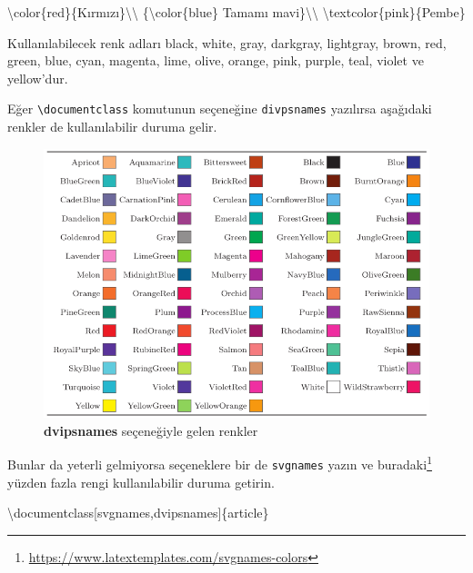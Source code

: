 \documentclass[
  10pt,
]{scrbook}
\newenvironment{Shaded}{\begin{snugshade}}{\end{snugshade}}
\newcommand{\BuiltInTok}[1]{#1}
\newcommand{\ExtensionTok}[1]{#1}
\newcommand{\FunctionTok}[1]{\textcolor[rgb]{0.00,0.00,0.00}{#1}}
\newcommand{\NormalTok}[1]{#1}
\renewcommand{\href}[2]{#2\footnote{\url{#1}}}
\theoremstyle{definition}
\theoremstyle{definition}
\theoremstyle{definition}
\theoremstyle{definition}
\theoremstyle{remark}
\begin{document}
\begin{Shaded}
\begin{Highlighting}[]
\FunctionTok{\textbackslash{}color}\NormalTok{\{red\}\{Kırmızı\}}\FunctionTok{\textbackslash{}\textbackslash{}}
\NormalTok{\{}\FunctionTok{\textbackslash{}color}\NormalTok{\{blue\} Tamamı mavi\}}\FunctionTok{\textbackslash{}\textbackslash{}}
\FunctionTok{\textbackslash{}textcolor}\NormalTok{\{pink\}\{Pembe\}}
\end{Highlighting}
\end{Shaded}

Kullanılabilecek renk adları black, white, gray, darkgray, lightgray, brown, red, green, blue, cyan, magenta, lime, olive, orange, pink, purple, teal, violet ve yellow'dur.

Eğer \texttt{\textbackslash{}documentclass} komutunun seçeneğine \texttt{divpsnames} yazılırsa aşağıdaki renkler de kullanılabilir duruma gelir.

\begin{figure}
\centering
\includegraphics[width=1\textwidth,height=\textheight]{images/renkler.png}
\caption{\textbf{dvipsnames} seçeneğiyle gelen renkler}
\end{figure}

Bunlar da yeterli gelmiyorsa seçeneklere bir de \texttt{svgnames} yazın ve \href{https://www.latextemplates.com/svgnames-colors}{buradaki} yüzden fazla rengi kullanılabilir duruma getirin.

\begin{Shaded}
\begin{Highlighting}[]
\BuiltInTok{\textbackslash{}documentclass}\NormalTok{[svgnames,dvipsnames]\{}\ExtensionTok{article}\NormalTok{\}}
\end{Highlighting}
\end{Shaded}
\end{document}
